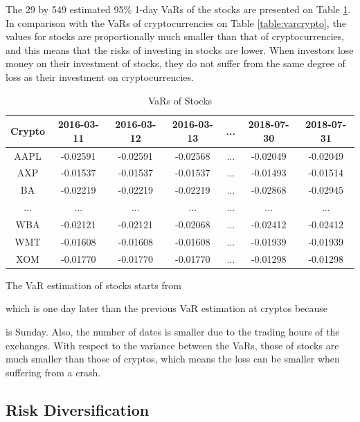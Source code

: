 \documentclass[11pt]{article} %
\theoremstyle{plain}
\theoremstyle{definition}
\begin{document}
The 29 by 549 estimated 95\% 1-day VaRs of the stocks are presented on Table \ref{table:varstock}. In comparison with the VaRs of cryptocurrencies on Table \ref{table:varcrypto}, the values for stocks are proportionally much smaller than that of cryptocurrencies, and this means that the risks of investing in stocks are lower. When investors lose money on their investment of stocks, they do not suffer from the same degree of loss as their investment on cryptocurrencies.

{
  \begin{table}[ht]
    \centering
    \small
    \begin{tabular}{|c|c c c c c c|}
        \hline
        Crypto & 2016-03-11 & 2016-03-12 & 2016-03-13 & ... & 2018-07-30 & 2018-07-31 \\ [0.5ex]
        \hline
        AAPL & -0.02591 & -0.02591 & -0.02568 & ... & -0.02049 & -0.02049 \\
        \hline
        AXP & -0.01537 & -0.01537 & -0.01537 & ... & -0.01493 & -0.01514 \\
        \hline
        BA & -0.02219 & -0.02219 & -0.02219 & ... & -0.02868 & -0.02945 \\
        \hline
        ... & ... & ... & ... & ... & ... & ... \\
        \hline
        WBA & -0.02121 & -0.02121 & -0.02068 & ... & -0.02412 & -0.02412 \\
        \hline
        WMT & -0.01608 & -0.01608 & -0.01608 & ... & -0.01939 & -0.01939 \\
        \hline
        XOM & -0.01770 & -0.01770 & -0.01770 & ... & -0.01298 & -0.01298 \\
        \hline
    \end{tabular}
    \caption{VaRs of Stocks}
    \label{table:varstock}
  \end{table}
}

The VaR estimation of stocks starts from \date{11th March 2016} which is one day later than the previous VaR estimation at cryptos because \date{10th Macth 2016} is Sunday. Also, the number of dates is smaller due to the trading hours of the exchanges. With respect to the variance between the VaRs, those of stocks are much smaller than those of cryptos, which means the loss can be smaller when suffering from a crash.

\subsection{Risk Diversification}
\end{document}
